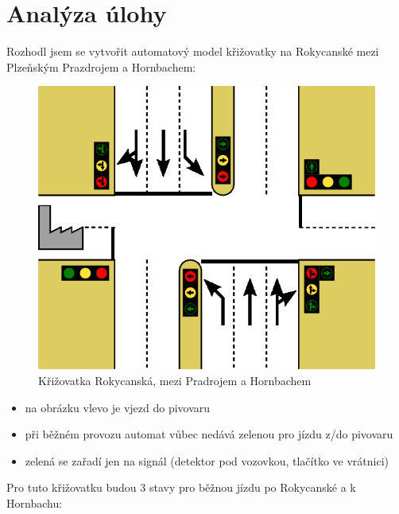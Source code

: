 \documentclass[12pt, a4paper]{report}
\begin{document}


\chapter{Analýza úlohy}

Rozhodl jsem se vytvořit automatový model křižovatky na Rokycanské mezi Plzeňským Prazdrojem a Hornbachem:

\begin{figure}[h]
	\centering
		\includegraphics{image/krizovatka_Prazdroj_Hornbach.jpg}
	\caption{Křižovatka Rokycanská, mezi Pradrojem a Hornbachem}
	\label{fig:krizovatka_Prazdroj_Hornbach}
\end{figure}

\begin{itemize}
	\item na obrázku vlevo je vjezd do pivovaru
	\item při běžném provozu automat vůbec nedává zelenou pro jízdu z/do pivovaru
	\item zelená se zařadí jen na signál (detektor pod vozovkou, tlačítko ve vrátnici)
\end{itemize}

\noindent
Pro tuto křižovatku budou 3 stavy pro běžnou jízdu po Rokycanské a k Hornbachu:
\end{document}
